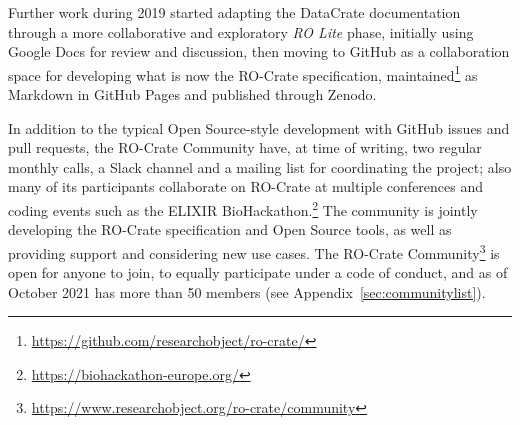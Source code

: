 \documentclass[ds,v1.1.2,openaccess]{iosart2x}%
\begin{document}
Further work during 2019 started adapting the DataCrate documentation
through a more collaborative and exploratory \textit{RO Lite} phase, initially
using Google Docs for review and discussion, then moving to GitHub as a
collaboration space for developing what is now the RO-Crate
specification, maintained\footnote{\url{https://github.com/researchobject/ro-crate/}} as
Markdown in GitHub Pages
and published through Zenodo.

In addition to the typical Open Source-style development with GitHub
issues and pull requests, the RO-Crate Community have, at time of
writing, two regular monthly calls, a Slack channel and a mailing list
for coordinating the project; also many of its participants collaborate
on RO-Crate at multiple conferences and coding events such as the
ELIXIR BioHackathon.\footnote{\url{https://biohackathon-europe.org/}} The community
is jointly developing the RO-Crate specification and Open Source tools,
as well as providing support and considering new use cases. The
RO-Crate Community\footnote{\url{https://www.researchobject.org/ro-crate/community}}
is open for anyone to join, to equally participate under a code of
conduct, and as of October 2021 has more than 50 members (see Appendix~\ref{sec:communitylist}).
\end{document}
